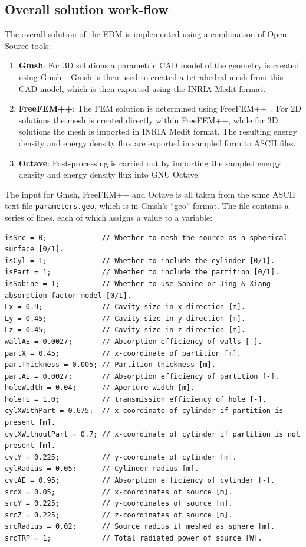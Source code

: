 \documentclass[a4paper]{article}
\numberwithin{equation}{section}
\begin{document}
\subsection[Overall solution work-flow]{Overall solution work-flow}
\label{sc:tcs:workflow}

The overall solution of the EDM is implemented using a combination of Open Source tools: 
\begin{enumerate}
 \item \textbf{Gmsh}: For 3D solutions a parametric CAD model of the geometry is created using 
 Gmsh~\citep{Geuzaine2009}. Gmsh is then used to created a tetrahedral mesh from this CAD model, which 
 is then exported using the INRIA Medit format.
 \item \textbf{FreeFEM++}: The FEM solution is determined using FreeFEM++~\citep{Hecht2013}. For 2D
 solutions the mesh is created directly within FreeFEM++, while for 3D solutions the mesh is imported in INRIA
 Medit format. The resulting energy density and energy density flux are exported in sampled form to ASCII files. 
 \item \textbf{Octave}: Post-processing is carried out by importing the sampled energy density and energy density 
 flux into GNU Octave.
\end{enumerate}
The input for Gmsh, FreeFEM++ and Octave is all taken from the same ASCII text file \texttt{parameters.geo}, which
is in Gmsh's ``geo'' format. The file contains a series of lines, each of which assigns a value to a variable:
{\small
\begin{verbatim}
isSrc = 0;             // Whether to mesh the source as a spherical surface [0/1].
isCyl = 1;             // Whether to include the cylinder [0/1].
isPart = 1;            // Whether to include the partition [0/1].
isSabine = 1;          // Whether to use Sabine or Jing & Xiang absorption factor model [0/1].
Lx = 0.9;              // Cavity size in x-direction [m].
Ly = 0.45;             // Cavity size in y-direction [m].
Lz = 0.45;             // Cavity size in z-direction [m].
wallAE = 0.0027;       // Absorption efficiency of walls [-].
partX = 0.45;          // x-coordinate of partition [m].
partThickness = 0.005; // Partition thickness [m].
partAE = 0.0027;       // Absorption efficiency of partition [-].
holeWidth = 0.04;      // Aperture width [m].
holeTE = 1.0;          // transmission efficiency of hole [-].
cylXWithPart = 0.675;  // x-coordinate of cylinder if partition is present [m].
cylXWithoutPart = 0.7; // x-coordinate of cylinder if partition is not present [m].
cylY = 0.225;          // y-coordinate of cylinder [m].
cylRadius = 0.05;      // Cylinder radius [m].
cylAE = 0.95;          // Absorption efficiency of cylinder [-].
srcX = 0.05;           // x-coordinates of source [m].
srcY = 0.225;          // y-coordinates of source [m].
srcZ = 0.225;          // z-coordinates of source [m].
srcRadius = 0.02;      // Source radius if meshed as sphere [m].
srcTRP = 1;            // Total radiated power of source [W].
\end{verbatim}}
\end{document}
